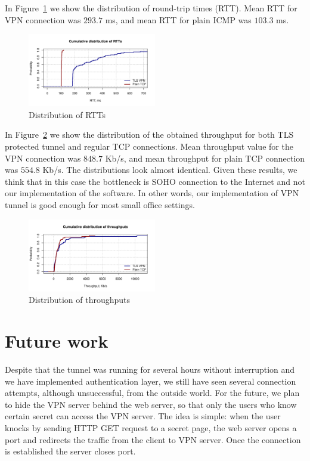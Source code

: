 In Figure~\ref{fig:rtt} we show the distribution of round-trip times
(RTT). Mean RTT for VPN connection was $293.7$ ms, and mean RTT for 
plain ICMP was $103.3$ ms.

\begin{figure}[!h]
        \includegraphics[width=0.5\textwidth]{graphics/rtt.pdf}
        \caption{Distribution of RTTs}
        \label{fig:rtt}
\end{figure}

In Figure~\ref{fig:iperf_distr} we show the distribution of the obtained throughput for both
TLS protected tunnel and regular TCP connections. Mean throughput value for the VPN connection was 
$848.7$ Kb/s, and mean throughput for plain TCP connection was $554.8$ Kb/s. The distributions 
look almost identical. Given these results, we think that in this case the bottleneck is SOHO
connection to the Internet and not our implementation of the software. In other words, 
our implementation of VPN tunnel is good enough for most small office settings.

\begin{figure}[!h]
        \includegraphics[width=0.5\textwidth]{graphics/throughput.pdf}
        \caption{Distribution of throughputs}
        \label{fig:iperf_distr}
\end{figure}


\section{Future work}

Despite that the tunnel was running for several hours without interruption and we have implemented 
authentication layer, we still have seen several connection attempts, although unsuccessful, from the outside 
world. For the future, we plan to hide the VPN server behind the web server, so that only the users 
who know certain secret can access the VPN server. The idea is simple: when the user knocks by sending
HTTP GET request to a secret page, the web server opens a port and redirects the traffic from
the client to VPN server. Once the connection is established the server closes port. 